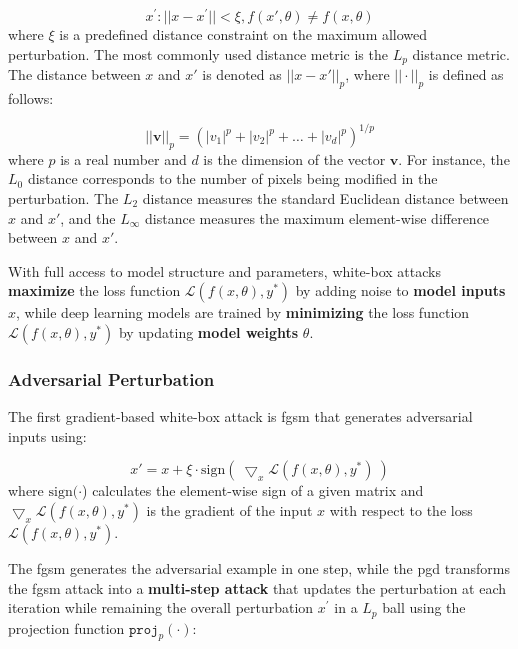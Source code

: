 \begin{equation}
x^{'}: ||x - x^{'}|| < \xi, f(x', \theta) \neq f(x, \theta)
\end{equation}
where $ \xi$ is a predefined distance constraint on the maximum allowed perturbation. The most commonly used distance metric is the $L_p$ distance metric. The distance between $x$ and $x'$ is denoted as $||x-x'||_{p}$, where $||\cdot||_p$ is defined as follows:

\begin{equation}
 ||\textbf{v}||_p = (|v_1|^p + |v_2|^p + \dots + |v_d|^p)^{1/p}
\end{equation}
where $p$ is a real number and $d$ is the dimension of the vector $\textbf{v}$. For instance, the $L_0$ distance corresponds to the number of pixels being modified in the perturbation. The $L_2$ distance measures the standard Euclidean distance between $x$ and $x'$, and the $L_\infty$ distance measures the maximum element-wise difference between $x$ and $x'$.

With full access to model structure and parameters, white-box attacks \textbf{maximize} the loss function $\mathcal{L}(f(x, \theta), y^*)$ by adding noise to \textbf{ model inputs} $x$, while deep learning models are trained by \textbf{minimizing} the loss function $\mathcal{L}(f(x, \theta), y^*)$ by updating \textbf{ model weights} $\theta$.

\subsubsection{Adversarial Perturbation}

The first gradient-based white-box attack is \acrfull{fgsm} \citep{GoodfellowSS14} that generates adversarial inputs using:

\begin{equation}
x' = x + \xi \cdot \text{sign}(\ \bigtriangledown_x \mathcal{L}(f(x, \theta), y^*)\ )    
\end{equation} 
where $\text{sign}(\cdot$) calculates the element-wise sign of a given matrix and $\bigtriangledown_x \mathcal{L}(f(x, \theta), y^*)$ is the gradient of the input $x$ with respect to the loss $\mathcal{L}(f(x, \theta), y^*)$.

The \acrshort{fgsm} generates the adversarial example in one step, while the \acrfull{pgd} \citep{madry2017towards} transforms the \acrshort{fgsm} attack into a \textbf{multi-step attack} that updates the perturbation at each iteration while remaining the overall perturbation $x^{'}$ in a $L_p$ ball using the projection function $\texttt{proj}_{p}(\cdot)$:

